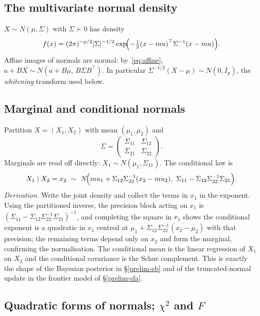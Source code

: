 \subsection{The multivariate normal density}

$X\sim N(\mu,\Sigma)$ with $\Sigma\succ 0$ has density
\begin{equation}
f(x)=(2\pi)^{-p/2}\lvert\Sigma\rvert^{-1/2}
\exp\!\Bigl(-\tfrac12 (x-\mu)^{\top}\Sigma^{-1}(x-\mu)\Bigr).
\end{equation}
Affine images of normals are normal: by~\eqref{eq:affine},
$a+BX\sim N(a+B\mu,\,B\Sigma B^{\top})$. In particular
$\Sigma^{-1/2}(X-\mu)\sim N(0,I_p)$, the \emph{whitening} transform used
below.

\subsection{Marginal and conditional normals}

Partition $X=(X_1,X_2)$ with mean $(\mu_1,\mu_2)$ and
\begin{equation}
\Sigma=\begin{pmatrix}\Sigma_{11}&\Sigma_{12}\\\Sigma_{21}&\Sigma_{22}\end{pmatrix}.
\end{equation}
Marginals are read off directly: $X_1\sim N(\mu_1,\Sigma_{11})$. The
conditional law is
\begin{equation}\label{eq:condnormal}
X_1\mid X_2=x_2\ \sim\ N\!\Bigl(\mu_1+\Sigma_{12}\Sigma_{22}^{-1}(x_2-\mu_2),\ \Sigma_{11}-\Sigma_{12}\Sigma_{22}^{-1}\Sigma_{21}\Bigr).
\end{equation}
\emph{Derivation.} Write the joint density and collect the terms in $x_1$
in the exponent. Using the partitioned inverse, the precision block acting
on $x_1$ is $(\Sigma_{11}-\Sigma_{12}\Sigma_{22}^{-1}\Sigma_{21})^{-1}$,
and completing the square in $x_1$ shows the conditional exponent is a
quadratic in $x_1$ centred at
$\mu_1+\Sigma_{12}\Sigma_{22}^{-1}(x_2-\mu_2)$ with that precision; the
remaining terms depend only on $x_2$ and form the marginal, confirming the
normalisation. The conditional mean is the linear regression of $X_1$ on
$X_2$ and the conditional covariance is the Schur complement. This is
exactly the shape of the Bayesian posterior in \S\ref{prelim-eb} and of
the truncated-normal update in the frontier model of \S\ref{prelim-sfa}.

\subsection{Quadratic forms of normals; $\chi^2$ and $F$}

